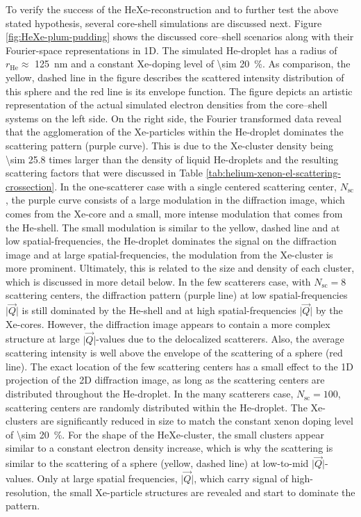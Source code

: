 To verify the success of the HeXe-reconstruction and to further test the above stated hypothesis, several core-shell simulations are discussed next. Figure \ref{fig:HeXe-plum-pudding} shows the discussed core--shell scenarios along with their Fourier-space representations in 1D. The simulated He-droplet has a radius of $r_{\text{He}}\approx$ \SI{125}{\nano\meter} and a constant Xe-doping level of \SI{\sim 20}{\percent}. As comparison, the yellow, dashed line in the figure describes the scattered intensity distribution of this sphere and the red line is its envelope function. The figure depicts an artistic representation of the actual simulated electron densities from the core--shell systems on the left side. On the right side, the Fourier transformed data reveal that the agglomeration of the Xe-particles within the He-droplet dominates the scattering pattern (purple curve). This is due to the Xe-cluster density being \num{\sim 25.8} times larger than the density of liquid He-droplets and the resulting scattering factors that were discussed in Table \ref{tab:helium-xenon-el-scattering-crossection}. In the one-scatterer case with a single centered scattering center, $N_{\text{sc}}$, the purple curve consists of a large modulation in the diffraction image, which comes from the Xe-core and a small, more intense modulation that comes from the He-shell. The small modulation is similar to the yellow, dashed line and at low spatial-frequencies, the He-droplet dominates the signal on the diffraction image and at large spatial-frequencies, the modulation from the Xe-cluster is more prominent. Ultimately, this is related to the size and density of each cluster, which is discussed in more detail below. In the few scatterers case, with $N_{\text{sc}}=8$ scattering centers, the diffraction pattern (purple line) at low spatial-frequencies $\lvert\vec{Q}\rvert$ is still dominated by the He-shell and at high spatial-frequencies $\lvert\vec{Q}\rvert$ by the Xe-cores. However, the diffraction image appears to contain a more complex structure at large $\lvert\vec{Q}\rvert$-values due to the delocalized scatterers. Also, the average scattering intensity is well above the envelope of the scattering of a sphere (red line). The exact location of the few scattering centers has a small effect to the 1D projection of the 2D diffraction image, as long as the scattering centers are distributed throughout the He-droplet. In the many scatterers case, $N_{\text{sc}}=100$, scattering centers are randomly distributed within the He-droplet. The Xe-clusters are significantly reduced in size to match the constant xenon doping level of \SI{\sim 20}{\percent}. For the shape of the HeXe-cluster, the small clusters appear similar to a constant electron density increase, which is why the scattering is similar to the scattering of a sphere (yellow, dashed line) at low-to-mid $\lvert\vec{Q}\rvert$-values. Only at large spatial frequencies, $\lvert\vec{Q}\rvert$, which carry signal of high-resolution, the small Xe-particle structures are revealed and start to dominate the pattern.\\[1\baselineskip]
